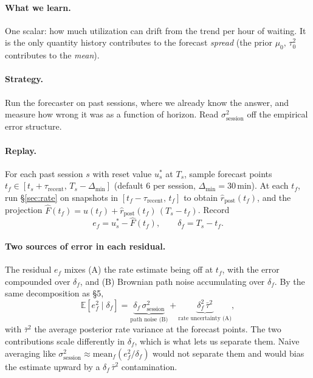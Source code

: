 \documentclass[11pt]{article}
\newcommand{\rpost}{\hat r_{\text{post}}}
\newcommand{\tauzerosq}{\tau_0^2}
\newcommand{\sigsessionsq}{\sigma_{\text{session}}^2}
\newcommand{\taurecent}{\tau_{\text{recent}}}
\begin{document}
\paragraph{What we learn.} One scalar: how much utilization can drift from
the trend per hour of waiting. It is the only quantity history contributes
to the forecast \emph{spread} (the prior $\mu_0,\,\tauzerosq$ contributes to
the \emph{mean}).

\paragraph{Strategy.} Run the forecaster on past sessions, where we already
know the answer, and measure how wrong it was as a function of horizon.
Read $\sigsessionsq$ off the empirical error structure.

\paragraph{Replay.} For each past session $s$ with reset value $u_s^\ast$ at
$T_s$, sample forecast points $t_f \in [t_s + \taurecent,\, T_s -
\Delta_{\min}]$ (default 6 per session, $\Delta_{\min} = 30$\,min). At each
$t_f$, run \S\ref{sec:rate} on snapshots in $[t_f - \taurecent,\, t_f]$ to
obtain $\rpost(t_f)$, and the projection $\hat F(t_f) = u(t_f) +
\rpost(t_f)\,(T_s - t_f)$. Record
\[
  e_f = u_s^\ast - \hat F(t_f),
  \qquad
  \delta_f = T_s - t_f.
\]

\paragraph{Two sources of error in each residual.} The residual $e_f$ mixes
(A) the rate estimate being off at $t_f$, with the error compounded over
$\delta_f$, and (B) Brownian path noise accumulating over $\delta_f$. By the
same decomposition as \S5,
\[
  \mathbb{E}[e_f^2 \mid \delta_f]
  = \underbrace{\delta_f\,\sigsessionsq}_{\text{path noise (B)}}
  + \underbrace{\delta_f^2\,\bar\tau^2}_{\text{rate uncertainty (A)}},
\]
with $\bar\tau^2$ the average posterior rate variance at the forecast
points. The two contributions scale differently in $\delta_f$, which is what
lets us separate them. Naive averaging like $\sigsessionsq \approx
\mathrm{mean}_f(e_f^2 / \delta_f)$ would not separate them and would bias
the estimate upward by a $\delta_f\,\bar\tau^2$ contamination.
\end{document}
